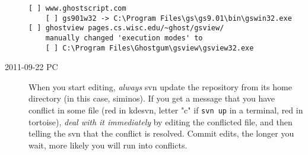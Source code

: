 \begin{description}
\begin{verbatim}
[ ] www.ghostscript.com
    [ ] gs901w32 -> C:\Program Files\gs\gs9.01\bin\gswin32.exe
[ ] ghostview pages.cs.wisc.edu/~ghost/gsview/
    manually changed 'execution modes' to
    [ ] C:\Program Files\Ghostgum\gsview\gsview32.exe
\end{verbatim}

\item[2011-09-22 PC] When you start editing, \emph{always} svn update
the repository from its home directory (in this case, siminos). If you
get a message that you have conflict in some file (red in kdesvn, letter "c"
if \texttt{svn up} in a terminal, red in tortoise), \emph{deal with it immediately}
by editing the conflicted file, and then telling the svn that the conflict is resolved.
Commit edits, the longer you wait, more likely you will run into conflicts.


\end{description}
